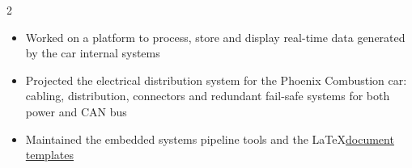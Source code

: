 \documentclass[9pt,a4paper,ragged2e,withhyper]{altacv}
\begin{document}
\begin{paracol}{2}

\begin{itemize}
  \item Worked on a platform to process, store and display real-time data generated by the car internal systems
  \item Projected the electrical distribution system for the Phoenix Combustion car: cabling, distribution, connectors and redundant fail-safe systems for both power and CAN bus
  \item Maintained the embedded systems pipeline tools and the \LaTeX \linebreak \href{https://github.com/engeniusua/engenius-ua-latex-template}{document templates}
\end{itemize}

\switchcolumn

\end{paracol}
\end{document}

